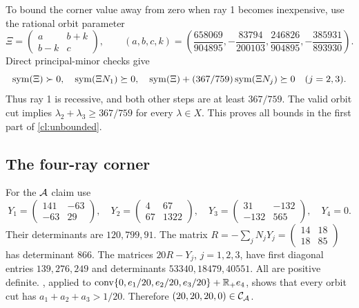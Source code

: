 To bound the corner value away from zero when ray 1 becomes inexpensive,
use the rational orbit parameter
\[
 \Xi=\begin{pmatrix}a&b+k\\b-k&c\end{pmatrix},\qquad
 (a,b,c,k)=
 \left(\frac{658069}{904895},-\frac{83794}{200103},
 \frac{246826}{904895},-\frac{385931}{893930}\right).
\]
Direct principal-minor checks give
\[
 \operatorname{sym}(\Xi)\succ0,\quad \operatorname{sym}(\Xi N_1)\succeq0,\quad
 \operatorname{sym}(\Xi)+(367/759)\operatorname{sym}(\Xi N_j)\succeq0\quad(j=2,3).
\]
Thus ray 1 is recessive, and both other steps are at least $367/759$.
The valid orbit cut implies $\lambda_2+\lambda_3\ge367/759$ for every
$\lambda\in X$. This proves all bounds in the first part of
\cref{cl:unbounded}.

\subsection{The four-ray corner}\label{cl:wcorner-proof}

For the $\mathcal A$ claim use
\[
 Y_1=\begin{pmatrix}141&-63\\-63&29\end{pmatrix},\quad
 Y_2=\begin{pmatrix}4&67\\67&1322\end{pmatrix},\quad
 Y_3=\begin{pmatrix}31&-132\\-132&565\end{pmatrix},\quad Y_4=0.
\]
Their determinants are $120,799,91$. The matrix
$R=-\sum_jN_jY_j=\left(\begin{smallmatrix}14&18\\18&85\end{smallmatrix}\right)$
has determinant $866$. The matrices $20R-Y_j$, $j=1,2,3$, have first
diagonal entries $139,276,249$ and determinants $53340,18479,40551$.
All are positive definite. , applied to
$\operatorname{conv}\{0,e_1/20,e_2/20,e_3/20\}+\mathbb R_+e_4$, shows that every orbit
cut has $a_1+a_2+a_3>1/20$.
Therefore $(20,20,20,0)\in\mathcal C_{\mathcal A}$.

